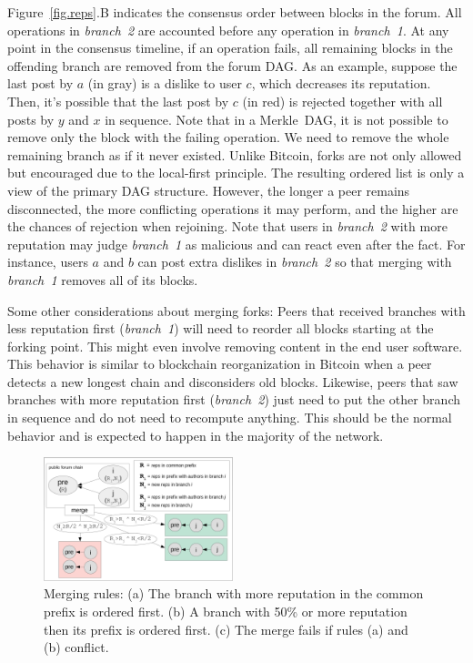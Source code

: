 \documentclass[10pt,journal,compsoc]{IEEEtran}
\begin{document}
Figure~\ref{fig.reps}.B indicates the consensus order between blocks in the
forum.
All operations in \emph{branch~2} are accounted before any operation in
\emph{branch~1}.
%
At any point in the consensus timeline, if an operation fails, all remaining
blocks in the offending branch are removed from the forum DAG.
As an example, suppose the last post by $a$ (in gray) is a dislike to user $c$,
which decreases its reputation.
Then, it's possible that the last post by $c$ (in red) is rejected together
with all posts by $y$ and $x$ in sequence.
Note that in a Merkle~DAG, it is not possible to remove only the block with the
failing operation.
We need to remove the whole remaining branch as if it never existed.
%
Unlike Bitcoin, forks are not only allowed but encouraged due to the
local-first principle.
The resulting ordered list is only a view of the primary DAG structure.
However, the longer a peer remains disconnected, the more conflicting
operations it may perform, and the higher are the chances of rejection when
rejoining.
%
Note that users in \emph{branch~2} with more reputation may judge
\emph{branch~1} as malicious and can react even after the fact.
For instance, users $a$ and $b$ can post extra dislikes in \emph{branch~2} so
that merging with \emph{branch~1} removes all of its blocks.

Some other considerations about merging forks:
Peers that received branches with less reputation first (\emph{branch~1}) will
need to reorder all blocks starting at the forking point.
This might even involve removing content in the end user software.
This behavior is similar to blockchain reorganization in Bitcoin when a peer
detects a new longest chain and disconsiders old blocks.
%
Likewise, peers that saw branches with more reputation first (\emph{branch~2})
just need to put the other branch in sequence and do not need to recompute
anything.
This should be the normal behavior and is expected to happen in the majority of
the network.

\begin{figure}
\centering
\includegraphics[width=0.49\textwidth]{merge.png}
\caption{
    Merging rules:
    (a) The branch with more reputation in the common prefix is ordered first.
    (b) A branch with 50\% or more reputation then its prefix is ordered first.
    (c) The merge fails if rules (a) and (b) conflict.
}
\label{fig.merge}
\end{figure}
\end{document}
